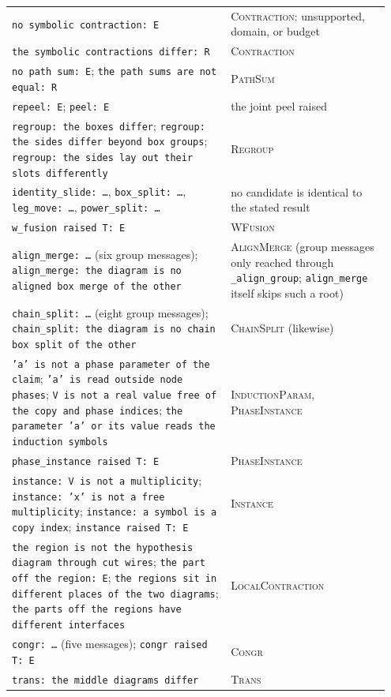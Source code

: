 \begin{small}
\begin{longtable}{@{}>{\raggedright\arraybackslash}p{0.55\linewidth}>{\raggedright\arraybackslash}p{0.4\linewidth}@{}}
\texttt{no symbolic contraction: E} & \textsc{Contraction}: unsupported, domain, or budget \\
\texttt{the symbolic contractions differ: R} & \textsc{Contraction} \\
\texttt{no path sum: E}; \texttt{the path sums are not equal: R} & \textsc{PathSum} \\
\texttt{repeel: E}; \texttt{peel: E} & the joint peel raised \\
\texttt{regroup: the boxes differ}; \texttt{regroup: the sides differ beyond box groups}; \texttt{regroup: the sides lay out their slots differently} & \textsc{Regroup} \\
\texttt{identity\_slide: \ldots}, \texttt{box\_split: \ldots}, \texttt{leg\_move: \ldots}, \texttt{power\_split: \ldots} & no candidate is identical to the stated result \\
\texttt{w\_fusion raised T: E} & \textsc{WFusion} \\
\texttt{align\_merge: \ldots} (six group messages); \texttt{align\_merge: the diagram is no aligned box merge of the other} & \textsc{AlignMerge} (group messages only reached through \texttt{\_align\_group}; \texttt{align\_merge} itself skips such a root) \\
\texttt{chain\_split: \ldots} (eight group messages); \texttt{chain\_split: the diagram is no chain box split of the other} & \textsc{ChainSplit} (likewise) \\
\texttt{'a' is not a phase parameter of the claim}; \texttt{'a' is read outside node phases}; \texttt{V is not a real value free of the copy and phase indices}; \texttt{the parameter 'a' or its value reads the induction symbols} & \textsc{InductionParam}, \textsc{PhaseInstance} \\
\texttt{phase\_instance raised T: E} & \textsc{PhaseInstance} \\
\texttt{instance: V is not a multiplicity}; \texttt{instance: 'x' is not a free multiplicity}; \texttt{instance: a symbol is a copy index}; \texttt{instance raised T: E} & \textsc{Instance} \\
\texttt{the region is not the hypothesis diagram through cut wires}; \texttt{the part off the region: E}; \texttt{the regions sit in different places of the two diagrams}; \texttt{the parts off the regions have different interfaces} & \textsc{LocalContraction} \\
\texttt{congr: \ldots} (five messages); \texttt{congr raised T: E} & \textsc{Congr} \\
\texttt{trans: the middle diagrams differ} & \textsc{Trans} \\

\end{longtable}
\end{small}
